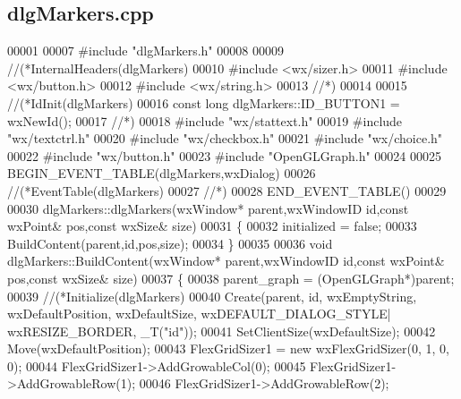 \subsection{dlg\+Markers.\+cpp}
\label{dlgMarkers_8cpp_source}

\begin{DoxyCode}
00001 
00007 \textcolor{preprocessor}{#include "dlgMarkers.h"}
00008 
00009 \textcolor{comment}{//(*InternalHeaders(dlgMarkers)}
00010 \textcolor{preprocessor}{#include <wx/sizer.h>}
00011 \textcolor{preprocessor}{#include <wx/button.h>}
00012 \textcolor{preprocessor}{#include <wx/string.h>}
00013 \textcolor{comment}{//*)}
00014 
00015 \textcolor{comment}{//(*IdInit(dlgMarkers)}
00016 \textcolor{keyword}{const} \textcolor{keywordtype}{long} dlgMarkers::ID_BUTTON1 = wxNewId();
00017 \textcolor{comment}{//*)}
00018 \textcolor{preprocessor}{#include "wx/stattext.h"}
00019 \textcolor{preprocessor}{#include "wx/textctrl.h"}
00020 \textcolor{preprocessor}{#include "wx/checkbox.h"}
00021 \textcolor{preprocessor}{#include "wx/choice.h"}
00022 \textcolor{preprocessor}{#include "wx/button.h"}
00023 \textcolor{preprocessor}{#include "OpenGLGraph.h"}
00024 
00025 BEGIN\_EVENT\_TABLE(dlgMarkers,wxDialog)
00026     \textcolor{comment}{//(*EventTable(dlgMarkers)}
00027     \textcolor{comment}{//*)}
00028 END\_EVENT\_TABLE()
00029 
00030 dlgMarkers::dlgMarkers(wxWindow* parent,wxWindowID \textcolor{keywordtype}{id},const wxPoint& pos,const wxSize& 
      size)
00031 \{
00032     initialized = \textcolor{keyword}{false};
00033     BuildContent(parent,\textcolor{keywordtype}{id},pos,size);
00034 \}
00035 
00036 \textcolor{keywordtype}{void} dlgMarkers::BuildContent(wxWindow* parent,wxWindowID \textcolor{keywordtype}{id},\textcolor{keyword}{const} wxPoint& pos,\textcolor{keyword}{const} wxSize& 
      size)
00037 \{
00038     parent_graph = (OpenGLGraph*)parent;
00039     \textcolor{comment}{//(*Initialize(dlgMarkers)}
00040     Create(parent, \textcolor{keywordtype}{id}, wxEmptyString, wxDefaultPosition, wxDefaultSize, wxDEFAULT\_DIALOG\_STYLE|
      wxRESIZE\_BORDER, _T(\textcolor{stringliteral}{"id"}));
00041     SetClientSize(wxDefaultSize);
00042     Move(wxDefaultPosition);
00043     FlexGridSizer1 = \textcolor{keyword}{new} wxFlexGridSizer(0, 1, 0, 0);
00044     FlexGridSizer1->AddGrowableCol(0);
00045     FlexGridSizer1->AddGrowableRow(1);
00046     FlexGridSizer1->AddGrowableRow(2);

\end{DoxyCode}
